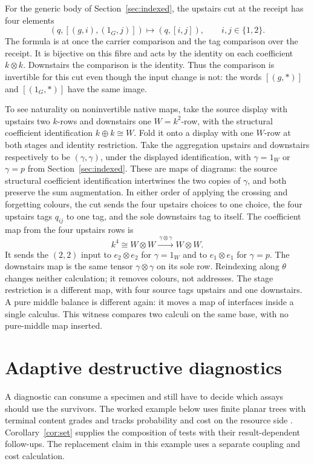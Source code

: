 \documentclass[11pt]{article}
\numberwithin{equation}{section}
\theoremstyle{definition}\newtheorem{definition}[theorem]{Definition}
\begin{document}
For the generic body of Section~\ref{sec:indexed}, the upstairs cut at
the receipt has four elements
\[
 (q,[(g,i),(1_G,j)])\longmapsto(q,[i,j]),
 \qquad i,j\in\{1,2\}.
\]
The formula is at once the carrier comparison and the tag comparison
over the receipt. It is bijective on this fibre and acts by the identity
on each coefficient $k\otimes k$. Downstairs the comparison is the
identity. Thus the comparison is invertible for this cut even though
the input change is not: the words $[(g,*)]$ and $[(1_G,*)]$ have the
same image.

To see naturality on noninvertible native maps, take the source
display with upstairs two $k$-rows and downstairs one $W=k^2$-row,
with the structural coefficient identification $k\oplus k\cong W$.
Fold it onto a display with one $W$-row at both stages and identity
restriction. Take the aggregation upstairs and downstairs respectively
to be $(\gamma,\gamma)$, under the displayed identification, with
$\gamma=1_W$ or $\gamma=p$ from Section~\ref{sec:indexed}. These are
maps of diagrams: the source structural coefficient identification
intertwines the two copies of $\gamma$, and both preserve the sum
augmentation. In either order of applying the crossing and forgetting
colours, the cut sends the four upstairs choices to one choice,
the four upstairs tags $q_{ij}$ to one tag, and the sole downstairs
tag to itself. The coefficient map from the four upstairs rows is
\[
 k^4\cong W\otimes W\xrightarrow{\ \gamma\otimes\gamma\ }W\otimes W .
\]
It sends the $(2,2)$ input to $e_2\otimes e_2$ for $\gamma=1_W$ and
to $e_1\otimes e_1$ for $\gamma=p$. The downstairs map is the same
tensor $\gamma\otimes\gamma$ on its sole row. Reindexing along $\theta$
changes neither calculation; it removes colours, not addresses.
The stage restriction is a different map, with four source tags
upstairs and one downstairs. A pure middle balance is different again:
it moves a map of interfaces inside a single calculus. This witness
compares two calculi on the same base, with no pure-middle map inserted.

\section{Adaptive destructive diagnostics}\label{app:diagnostic}\label{sec:diagnostic}
A diagnostic can consume a specimen and still have to decide which
assays should use the survivors. The worked example below uses
finite planar trees with terminal content grades and tracks
probability and cost on the resource side
\cite[Secs.~2--3]{Casebook}. Corollary~\ref{cor:set} supplies the
composition of tests with their result-dependent follow-ups.
The replacement claim in this example uses a separate coupling and
cost calculation.
\end{document}
